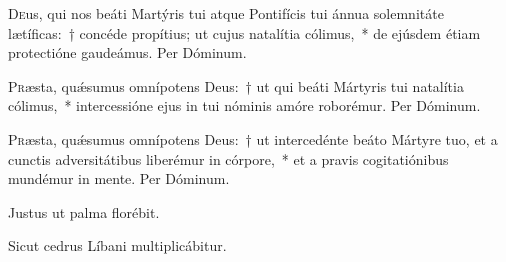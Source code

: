 \documentclass[vesperale_romanum.tex]{subfiles}
\begin{document}
\lettrine{D}{e}us, qui nos beáti  \nomen{} Martýris tui atque Pontifícis tui ánnua sole\-mnitáte lætíficas:~† concéde propítius; ut cujus natalítia cólimus,~* de ejúsdem étiam prote\-ctióne gaudeámus. Per Dóminum.


\lettrine{P}{r}æsta, quǽsumus omnípotens Deus:~† ut qui beáti \nomen{} Mártyris tui natalítia cólimus,~* intercessióne ejus in tui nóminis amóre roborémur. Per Dóminum.

\aliaoratio

\lettrine{P}{r}æsta, quǽsumus omnípotens Deus:~† ut intercedénte beáto \nomen{} Mártyre tuo, et a cun\-ctis adversitátibus liberémur in córpore,~*  et a pravis cogitatiónibus mundémur in mente. Per Dóminum.





\newpage


\vv Justus ut palma florébit.

\rr Sicut cedrus Líbani multiplicábitur.

\label{an_qui_vult_venire_solesmes_1961}
{}
\end{document}

